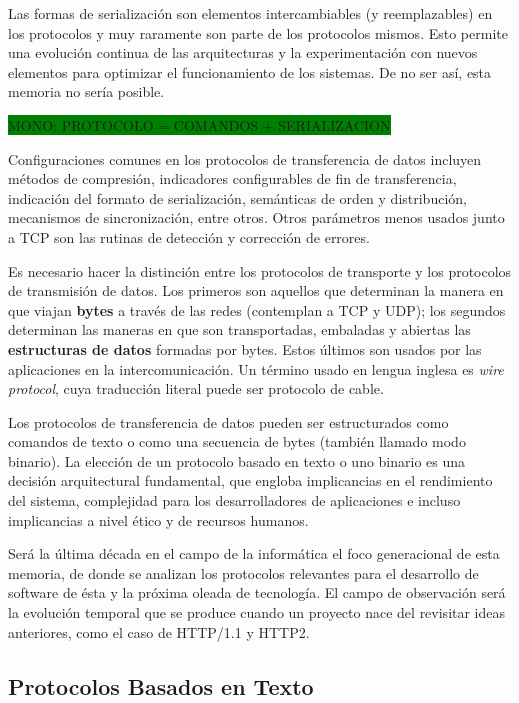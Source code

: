 Las formas de serialización son elementos intercambiables (y reemplazables) en los protocolos y muy raramente son parte de los protocolos mismos. Esto permite una evolución continua de las arquitecturas y la experimentación con nuevos elementos para optimizar el funcionamiento de los sistemas. De no ser así, esta memoria no sería posible.

\colorbox{green}{MONO: PROTOCOLO = COMANDOS + SERIALIZACION}

Configuraciones comunes en los protocolos de transferencia de datos incluyen métodos de compresión, indicadores configurables de fin de transferencia, indicación del formato de serialización, semánticas de orden y distribución, mecanismos de sincronización, entre otros. Otros parámetros menos usados junto a TCP son las rutinas de detección y corrección de errores.

Es necesario hacer la distinción entre los protocolos de transporte y los protocolos de transmisión de datos. Los primeros son aquellos que determinan la manera en que viajan \textbf{bytes} a través de las redes (contemplan a TCP y UDP); los segundos determinan las maneras en que son transportadas, embaladas y abiertas las \textbf{estructuras de datos} formadas por bytes. Estos últimos son usados por las aplicaciones en la intercomunicación. Un término usado en lengua inglesa es \textit{wire protocol}, cuya traducción literal puede ser protocolo de cable.

Los protocolos de transferencia de datos pueden ser estructurados como comandos de texto o como una secuencia de bytes (también llamado modo binario). La elección de un protocolo basado en texto o uno binario es una decisión arquitectural fundamental, que engloba implicancias en el rendimiento del sistema, complejidad para los desarrolladores de aplicaciones e incluso implicancias a nivel ético y de recursos humanos.

Será la última década en el campo de la informática el foco generacional de esta memoria, de donde se analizan los protocolos relevantes para el desarrollo de software de ésta y la próxima oleada de tecnología. El campo de observación será la evolución temporal que se produce cuando un proyecto nace del revisitar ideas anteriores, como el caso de HTTP/1.1 y HTTP2.

\subsection{Protocolos Basados en Texto}

